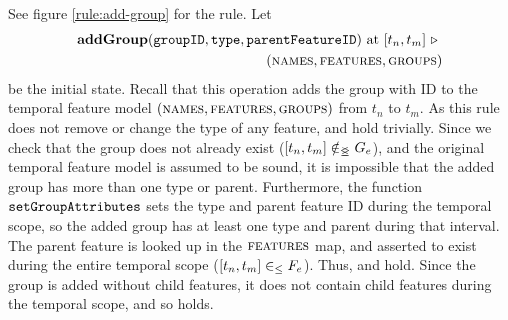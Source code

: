 See figure \vref{rule:add-group} for the  rule. 
Let 
\begin{equation*}
   \begin{split}
      \textbf{addGroup}(\var{groupID}, \var{type}, \var{parentFeatureID})\text{ at }\interval{t_n}{t_m}
      \shove \\
   (\names{}, \features{}, \groups{})
\end{split}
\end{equation*}
be the initial state. Recall that this operation adds the group with ID  to the temporal feature model $(\textsc{names}{}, \textsc{features}{}, \textsc{groups}{}{})$ from $t_n$ to $t_m$. As this rule does not remove or change the type of any feature,  and  hold trivially. Since we check that the group does not already exist ($\interval{t_n}{t_m} \notinnr G_e$), and the original temporal feature model is assumed to be sound, it is impossible that the added group has more than one type or parent. Furthermore, the function $\texttt{setGroupAttributes}$ sets the type and parent feature ID during the temporal scope, so the added group has at least one type and parent during that interval. The parent feature is looked up in the $\textsc{features}{}$ map, and asserted to exist during the entire temporal scope ($\interval{t_n}{t_m} \inn F_e$). Thus,  and  hold. Since the group is added without child features, it does not contain child features during the temporal scope, and so  holds.

